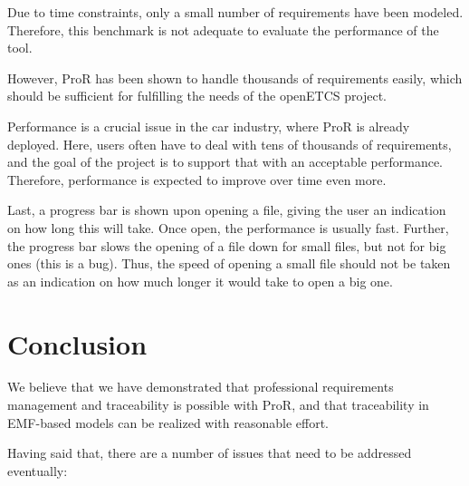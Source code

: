 \documentclass{template/openetcs_report}
\begin{document}
Due to time constraints, only a small number of requirements have been modeled.  Therefore, this benchmark is not adequate to evaluate the performance of the tool.

However, ProR has been shown to handle thousands of requirements easily, which should be sufficient for fulfilling the needs of the openETCS project.

Performance is a crucial issue in the car industry, where ProR is already deployed.  Here, users often have to deal with tens of thousands of requirements, and the goal of the project is to support that with an acceptable performance.  Therefore, performance is expected to improve over time even more.

Last, a progress bar is shown upon opening a file, giving the user an indication on how long this will take.  Once open, the performance is usually fast.  Further, the progress bar slows the opening of a file down for small files, but not for big ones (this is a bug).  Thus, the speed of opening a small file should not be taken as an indication on how much longer it would take to open a big one.

\chapter{Conclusion}

We believe that we have demonstrated that professional requirements management and traceability is possible with ProR, and that traceability in EMF-based models can be realized with reasonable effort.

Having said that, there are a number of issues that need to be addressed eventually:
\end{document}

